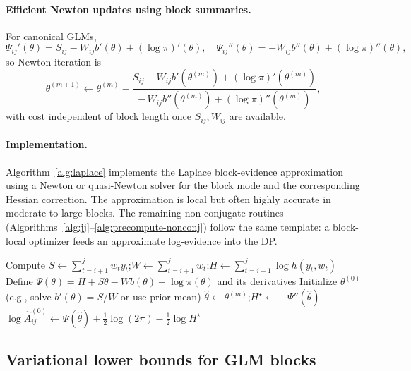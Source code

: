 \paragraph{Efficient Newton updates using block summaries.}
For canonical GLMs,
\[
\Psi_{ij}'(\theta) = S_{ij} - W_{ij} b'(\theta) + (\log\pi)'(\theta),\quad
\Psi_{ij}''(\theta) = -W_{ij} b''(\theta) + (\log\pi)''(\theta),
\]
so Newton iteration is
\[
\theta^{(m+1)} \leftarrow \theta^{(m)}
 - \frac{S_{ij} - W_{ij} b'(\theta^{(m)}) + (\log\pi)'(\theta^{(m)})}
        {-\,W_{ij} b''(\theta^{(m)}) + (\log\pi)''(\theta^{(m)})},
\]
with cost independent of block length once $S_{ij},W_{ij}$ are available.

\paragraph{Implementation.}
Algorithm~\ref{alg:laplace} implements the Laplace block-evidence approximation using a Newton
or quasi-Newton solver for the block mode and the corresponding Hessian correction. The
approximation is local but often highly accurate in moderate-to-large blocks. The remaining
non-conjugate routines (Algorithms~\ref{alg:jj}--\ref{alg:precompute-nonconj}) follow the same
template: a block-local optimizer feeds an approximate log-evidence into the DP.

\begin{algorithm}[H]
\caption{GLMBlock\_Laplace$(y,w,i,j,\texttt{b},\texttt{prior})$}
\label{alg:laplace}
Compute $S\leftarrow \sum_{t=i+1}^j w_t y_t$;\quad $W\leftarrow \sum_{t=i+1}^j w_t$;\quad $H\leftarrow \sum_{t=i+1}^j \log h(y_t,w_t)$\;
Define $\Psi(\theta)=H + S\theta - W b(\theta) + \log \pi(\theta)$ and its derivatives\;
Initialize $\theta^{(0)}$ (e.g., solve $b'(\theta)=S/W$ or use prior mean)\;
$\hat\theta\leftarrow \theta^{(m)}$;\quad $H^\star\leftarrow -\,\Psi''(\hat\theta)$\;
$\log \widehat{A}^{(0)}_{ij}\leftarrow \Psi(\hat\theta) + \tfrac{1}{2}\log(2\pi) - \tfrac{1}{2}\log H^\star$\;
\end{algorithm}

\subsection{Variational lower bounds for GLM blocks}

